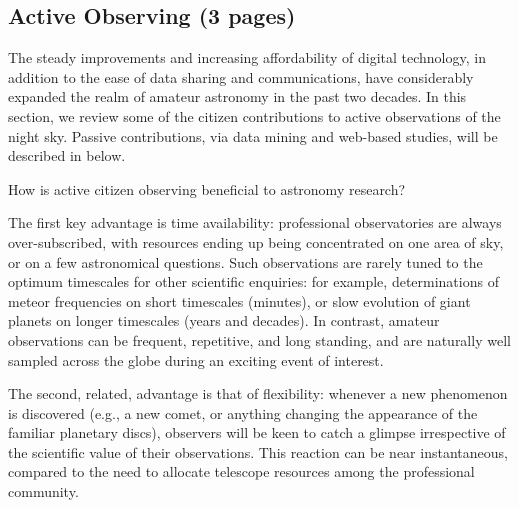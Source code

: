 \documentclass{ar2e}
\begin{document}
\subsection{Active Observing (3 pages)}
\label{sec:obs:active}


The steady improvements and increasing affordability of digital technology, in
addition to the ease of data sharing and communications, have considerably
expanded the realm of amateur astronomy in the past two decades.  
In this section, we review some of the citizen contributions to active
observations of the night sky.  Passive contributions, via data mining and
web-based studies, will be described in  below.

How is active citizen observing beneficial to astronomy research? 

The first key advantage is time availability: professional observatories are
always over-subscribed, with resources ending up being concentrated on one area
of sky, or on a few astronomical questions.  Such observations are rarely tuned
to the optimum timescales for other scientific enquiries: for example,
determinations of meteor frequencies on short timescales (minutes), or slow
evolution of giant planets on longer timescales (years and decades).  In
contrast, amateur observations can be frequent, repetitive, and long standing,
and are naturally well sampled across the globe during an exciting event of
interest. 

The second, related, advantage is that of flexibility: whenever a new phenomenon
is discovered (e.g., a new comet, or anything changing the appearance of the
familiar planetary discs), observers will be keen to catch a glimpse
irrespective of the scientific value of their observations.  This reaction can
be near instantaneous, compared to the need to allocate telescope resources
among the professional community.  
\end{document}
